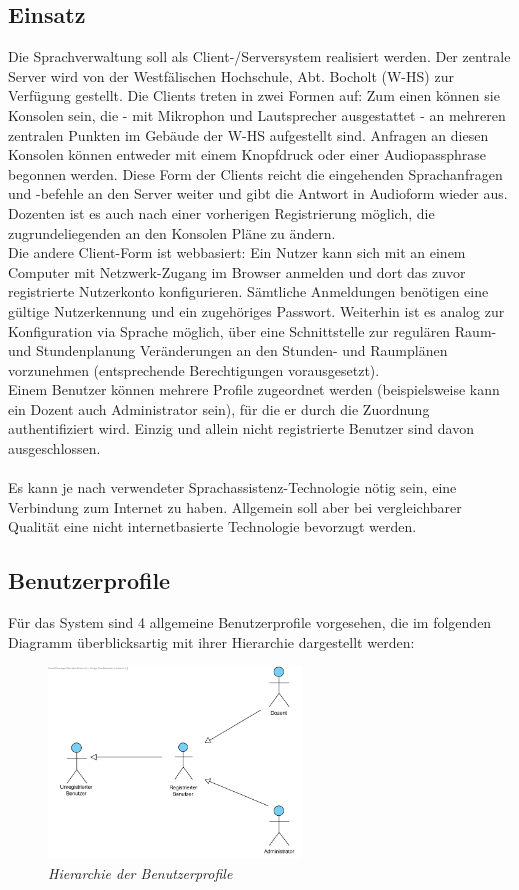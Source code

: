 \documentclass[12pt, a4paper]{scrartcl}
\begin{document}
\subsection{Einsatz}
Die Sprachverwaltung soll als Client-/Serversystem realisiert werden. Der zentrale Server wird von der Westfälischen Hochschule, Abt. Bocholt (W-HS) zur Verfügung gestellt. Die Clients treten in zwei Formen auf: Zum einen können sie Konsolen sein, die - mit Mikrophon und Lautsprecher ausgestattet - an mehreren zentralen Punkten im  Gebäude der W-HS aufgestellt sind. Anfragen an diesen Konsolen können entweder mit einem Knopfdruck oder einer Audiopassphrase begonnen werden. Diese Form der Clients reicht die eingehenden Sprachanfragen und -befehle an den Server weiter und gibt die Antwort in Audioform wieder aus. Dozenten ist es auch nach einer vorherigen Registrierung möglich, die zugrundeliegenden an den Konsolen Pläne zu ändern.\\
Die andere Client-Form ist webbasiert: Ein Nutzer kann sich mit an einem Computer mit Netzwerk-Zugang im Browser anmelden und dort das zuvor registrierte Nutzerkonto konfigurieren. Sämtliche Anmeldungen benötigen eine gültige Nutzerkennung und ein zugehöriges Passwort. Weiterhin ist es analog zur Konfiguration via Sprache möglich, über eine Schnittstelle zur regulären Raum- und Stundenplanung Veränderungen an den Stunden- und Raumplänen vorzunehmen (entsprechende Berechtigungen vorausgesetzt).\\
Einem Benutzer können mehrere Profile zugeordnet werden (beispielsweise kann ein Dozent auch Administrator sein), für die er durch die Zuordnung authentifiziert wird. Einzig und allein nicht registrierte Benutzer sind davon ausgeschlossen.\\
\\
Es kann je nach verwendeter Sprachassistenz-Technologie nötig sein, eine Verbindung zum Internet zu haben. Allgemein soll 
aber bei vergleichbarer Qualität eine nicht internetbasierte Technologie bevorzugt werden.

\subsection{Benutzerprofile}
Für das System sind 4 allgemeine Benutzerprofile vorgesehen, die im folgenden Diagramm überblicksartig mit ihrer Hierarchie dargestellt werden:

\begin{figure}[h!]
		\includegraphics[width=0.6\textwidth]{nutzer.png}
	\caption{\emph{Hierarchie der Benutzerprofile}}
	\label{fig:hierarchie}
\end{figure}
\end{document}
